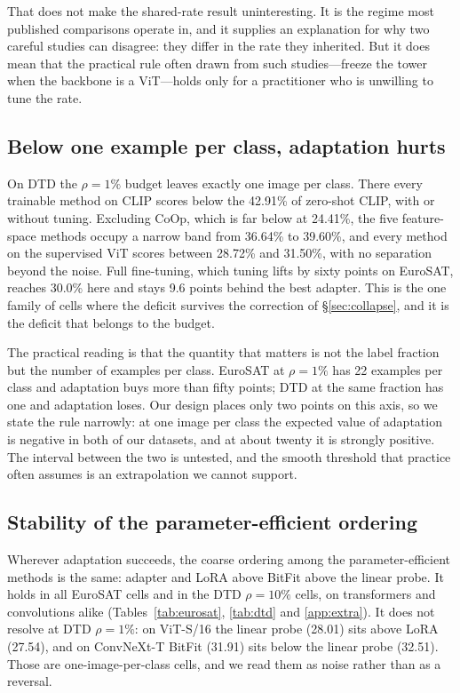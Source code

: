 \documentclass[preprint,12pt]{elsarticle}
\begin{document}
That does not make the shared-rate result uninteresting. It is the regime most
published comparisons operate in, and it supplies an explanation for why two
careful studies can disagree: they differ in the rate they inherited. But it does
mean that the practical rule often drawn from such studies---freeze the tower when
the backbone is a ViT---holds only for a practitioner who is unwilling to tune the
rate.

\subsection{Below one example per class, adaptation hurts}
\label{sec:onelabel}

On DTD the $\rho=1\%$ budget leaves exactly one image per class. There every
trainable method on CLIP scores below the 42.91\% of zero-shot CLIP, with or
without tuning. Excluding CoOp, which is far below at 24.41\%, the five
feature-space methods occupy a narrow band from 36.64\% to 39.60\%, and every
method on the supervised ViT scores between 28.72\% and 31.50\%, with no
separation beyond the noise. Full fine-tuning, which tuning lifts by sixty points
on EuroSAT, reaches 30.0\% here and stays 9.6 points behind the best adapter.
This is the one family of cells where the deficit survives the correction of
\S\ref{sec:collapse}, and it is the deficit that belongs to the budget.

The practical reading is that the quantity that matters is not the label fraction
but the number of examples per class. EuroSAT at $\rho=1\%$ has 22 examples per
class and adaptation buys more than fifty points; DTD at the same fraction has
one and adaptation loses. Our design places only two points on this axis, so we
state the rule narrowly: at one image per class the expected value of adaptation
is negative in both of our datasets, and at about twenty it is strongly positive.
The interval between the two is untested, and the smooth threshold that practice
often assumes is an extrapolation we cannot support.

\subsection{Stability of the parameter-efficient ordering}

Wherever adaptation succeeds, the coarse ordering among the parameter-efficient
methods is the same: adapter and LoRA above BitFit above the linear probe. It
holds in all EuroSAT cells and in the DTD $\rho=10\%$ cells, on transformers and
convolutions alike (Tables~\ref{tab:eurosat}, \ref{tab:dtd} and
\ref{app:extra}). It does not resolve at DTD $\rho=1\%$: on ViT-S/16 the
linear probe (28.01) sits above LoRA (27.54), and on ConvNeXt-T BitFit (31.91)
sits below the linear probe (32.51). Those are one-image-per-class cells, and we
read them as noise rather than as a reversal.
\end{document}
